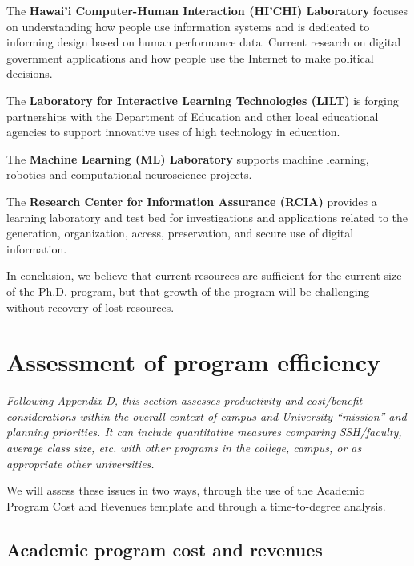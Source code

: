 \documentclass[12pt]{article}
\begin{document}
\medskip\noindent The {\bf Hawai'i Computer-Human Interaction (HI'CHI) Laboratory} focuses on
understanding how people use information systems and is dedicated to
informing design based on human performance data. Current research on
digital government applications and how people use the Internet to make
political decisions.

\medskip\noindent The {\bf Laboratory for Interactive Learning Technologies (LILT)} is
forging partnerships with the Department of Education and other local
educational agencies to support innovative uses of high technology in
education.

\medskip\noindent The {\bf Machine Learning (ML) Laboratory} supports machine learning,
robotics and computational neuroscience projects.

\medskip\noindent The {\bf Research Center for Information Assurance (RCIA)} provides a
learning laboratory and test bed for investigations and applications
related to the generation, organization, access, preservation, and secure
use of digital information.


In conclusion, we believe that current resources are sufficient for the
current size of the Ph.D. program, but that growth of the program will be
challenging without recovery of lost resources.




\section{Assessment of program efficiency}

{\em Following Appendix D, this section assesses productivity and
  cost/benefit considerations within the overall context of campus and
  University ``mission'' and planning priorities.  It can include
  quantitative measures comparing SSH/faculty, average class size,
  etc. with other programs in the college, campus, or as appropriate other
  universities.}

We will assess these issues in two ways, through the use of the Academic
Program Cost and Revenues template and through a time-to-degree analysis.

\subsection{Academic program cost and revenues}
\end{document}
